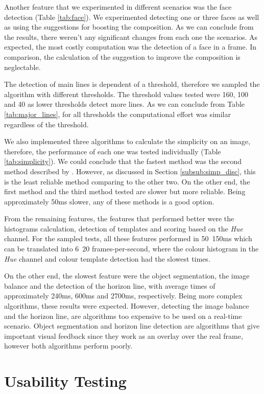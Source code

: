 Another feature that we experimented in different scenarios was the face detection (Table \ref{tab:face}). We experimented detecting one or three faces as well as using the suggestions for boosting the composition. As we can conclude from the results, there weren't any significant changes from each one the scenarios. As expected, the most costly computation was the detection of a face in a frame. In comparison, the calculation of the suggestion to improve the composition is neglectable.

The detection of main lines is dependent of a threshold, therefore we sampled the algorithm with different thresholds. The threshold values tested were 160, 100 and 40 as lower thresholds detect more lines. As we can conclude from Table \ref{tab:major_lines}, for all thresholds the computational effort was similar regardless of the threshold.

We also implemented three algorithms to calculate the simplicity on an image, therefore, the performance of each one was tested individually (Table \ref{tab:simplicity}). We could conclude that the fastest method was the second method described by \citeauthor{kaoautomatic} \cite{kaoautomatic}. However, as discussed in Section \ref{subsub:simp_disc}, this is the least reliable method comparing to the other two. On the other end, the first method \cite{luo2008photo} and the third method \cite{ke2006design} tested are slower but more reliable. Being approximately 50ms slower, any of these methods is a good option.

From the remaining features, the features that performed better were the histograms calculation, detection of templates and scoring based on the \emph{Hue} channel. For the sampled tests, all these features performed in 50~150ms which can be translated into 6~20 frames-per-second, where the colour histogram in the \emph{Hue} channel and colour template detection had the slowest times. 

On the other end, the slowest feature were the object segmentation, the image balance and the detection of the horizon line, with average times of approximately 240ms, 600ms and 2700ms, respectively. Being more complex algorithms, these results were expected. However, detecting the image balance and the horizon line, are algorithms too expensive to be used on a real-time scenario. Object segmentation and horizon line detection are algorithms that give important visual feedback since they work as an overlay over the real frame, however both algorithms perform poorly.

 
\section{Usability Testing}